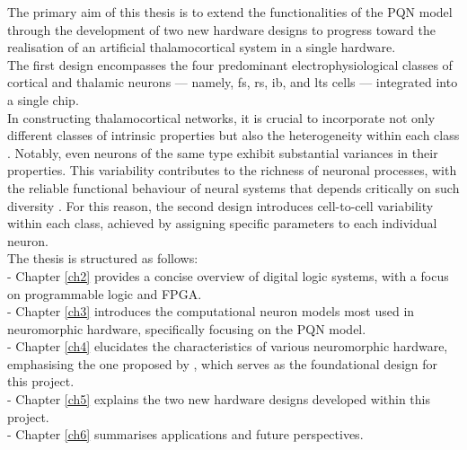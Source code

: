 The primary aim of this thesis is to extend the functionalities 
of the PQN model through the development of two new hardware 
designs to progress toward the realisation 
of an artificial thalamocortical system in a single hardware.\\
The first design encompasses the four predominant 
electrophysiological classes of cortical and thalamic 
neurons — namely, \acrfull{fs}, \acrfull{rs}, 
\acrfull{ib}, and \acrfull{lts} cells — integrated into a single chip.\\
In constructing 
thalamocortical networks, it is crucial to incorporate not 
only different classes of intrinsic properties but also the 
heterogeneity within each class 
\cite{Pospischil}. Notably, even neurons of the same 
type exhibit substantial variances in their properties. 
This variability contributes to the 
richness of neuronal processes, with the reliable 
functional behaviour of neural systems that depends critically 
on such diversity \cite{Lengler}. For this reason, 
the second design introduces cell-to-cell variability within 
each class, achieved by assigning specific parameters
to each individual neuron.\\

The thesis is structured as follows:\\
- Chapter \ref{ch2} provides a concise overview of digital logic systems, with a focus on programmable logic and FPGA.\\
- Chapter \ref{ch3} introduces the computational neuron models most used in neuromorphic hardware, specifically focusing on the PQN model.\\
- Chapter \ref{ch4} elucidates the characteristics of various neuromorphic hardware, emphasising the one proposed by \cite{Nanami}, which serves as the foundational design for this project.\\
- Chapter \ref{ch5} explains the two new hardware designs developed within this project.\\
- Chapter \ref{ch6} summarises applications and future perspectives.\\